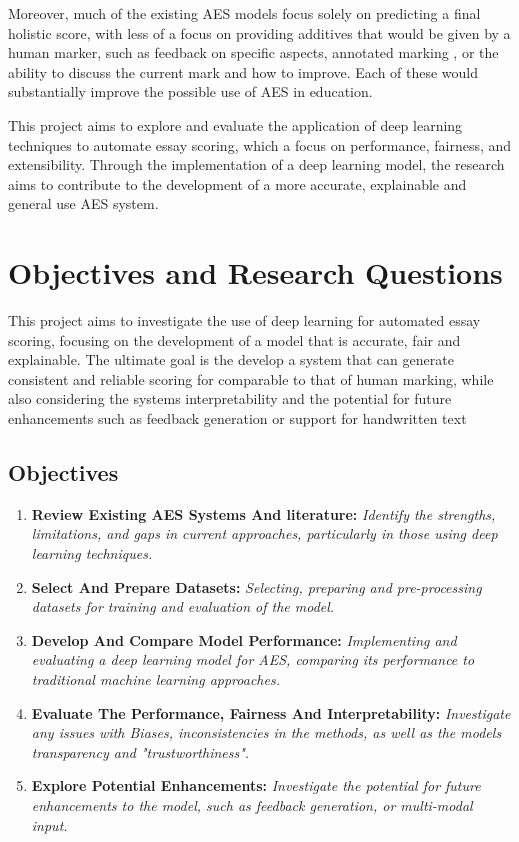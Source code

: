 \documentclass[11pt]{article}
\begin{document}
Moreover, much of the existing AES models focus solely on predicting a final holistic score, with less of a focus on providing additives that would be given by a human marker,
such as feedback on specific aspects, annotated marking , or the ability to discuss the current mark and how to improve. Each of these would substantially improve the
possible use of AES in education.

This project aims to explore and evaluate the application of deep learning techniques to automate essay scoring, which a focus on performance, fairness, and extensibility. Through the implementation of
a deep learning model, the research aims to contribute to the development of a more accurate, explainable and general use AES system.


\section*{Objectives and Research Questions}
This project aims to investigate the use of deep learning for automated essay scoring, focusing on the development of a model that
is accurate, fair and explainable. The ultimate goal is the develop a system that can generate consistent
and reliable scoring for comparable to that of human marking, while also considering the systems interpretability and the 
potential for future enhancements such as feedback generation or support for handwritten text

\subsection{Objectives}
\begin{enumerate}
    \item \textbf{Review Existing AES Systems And literature:} \textit{Identify the strengths, limitations, and gaps in current approaches,
    particularly in those using deep learning techniques.}
    \item \textbf{Select And Prepare Datasets:} \textit{Selecting, preparing and pre-processing datasets for training and evaluation of the model.}
    \item \textbf{Develop And Compare Model Performance:} \textit{Implementing and evaluating a deep learning model for AES,
    comparing its performance to traditional machine learning approaches.}
    \item \textbf{Evaluate The Performance, Fairness And Interpretability:} \textit{Investigate any issues with Biases, inconsistencies in the methods, as well as
    the models transparency and "trustworthiness".}
    \item \textbf{Explore Potential Enhancements:} \textit{Investigate the potential for future enhancements to the model, such as feedback generation, or multi-modal input.}
\end{enumerate}
\end{document}
